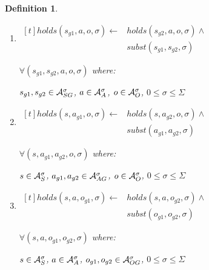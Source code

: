 \documentclass[10pt, twocolumn]{article}
\newtheorem{definition}{Definition}
\begin{document}
\begin{definition}
\begin{enumerate}
                $\forall (s, a, o_{s}, o_{g}, \sigma)$ where:

                $s \in {\cal A}^{\sigma}_{S}$,
                $a \in {\cal A}^{\sigma}_{A}$,
                $o_{s} \in {\cal A}^{\sigma}_{OS}$,
                $o_{g} \in {\cal A}^{\sigma}_{OG}$,
                $0 \leq \sigma \leq \Sigma$
              \item
                \begin{math}
                  \begin{aligned}[t]
                    holds(s_{g1}, a, o, \sigma) \leftarrow &
                    holds(s_{g2}, a, o, \sigma) \land \\
                    & subst(s_{g1}, s_{g2}, \sigma)
                  \end{aligned}
                \end{math}

                $\forall (s_{g1}, s_{g2}, a, o, \sigma)$ where:

                $s_{g1}, s_{g2} \in {\cal A}^{\sigma}_{SG}$,
                $a \in {\cal A}^{\sigma}_{A}$,
                $o \in {\cal A}^{\sigma}_{O}$,
                $0 \leq \sigma \leq \Sigma$
              \item
                \begin{math}
                  \begin{aligned}[t]
                    holds(s, a_{g1}, o, \sigma) \leftarrow &
                    holds(s, a_{g2}, o, \sigma) \land \\
                    & subst(a_{g1}, a_{g2}, \sigma)
                  \end{aligned}
                \end{math}

                $\forall (s, a_{g1}, a_{g2}, o, \sigma)$ where:

                $s \in {\cal A}^{\sigma}_{S}$,
                $a_{g1}, a_{g2} \in {\cal A}^{\sigma}_{AG}$,
                $o \in {\cal A}^{\sigma}_{O}$,
                $0 \leq \sigma \leq \Sigma$
              \item
                \begin{math}
                  \begin{aligned}[t]
                    holds(s, a, o_{g1}, \sigma) \leftarrow &
                    holds(s, a, o_{g2}, \sigma) \land \\
                    & subst(o_{g1}, o_{g2}, \sigma)
                  \end{aligned}
                \end{math}

                $\forall (s, a, o_{g1}, o_{g2}, \sigma)$ where:

                $s \in {\cal A}^{\sigma}_{S}$,
                $a \in {\cal A}^{\sigma}_{A}$,
                $o_{g1}, o_{g2} \in {\cal A}^{\sigma}_{OG}$,
                $0 \leq \sigma \leq \Sigma$
            \end{enumerate}
          \end{definition}
\end{document}
